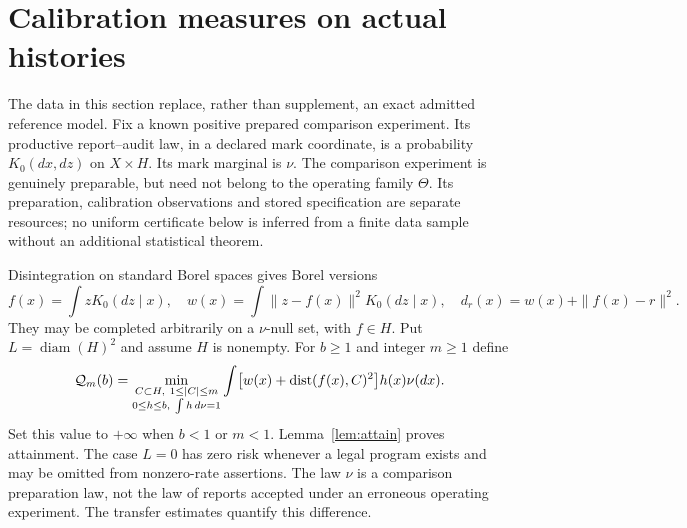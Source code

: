 \section{Calibration measures on actual histories}
\label{sec:calibrated}
The data in this section replace, rather than supplement, an exact admitted reference model. Fix a known positive prepared comparison experiment. Its productive report--audit law, in a declared mark coordinate, is a probability $K_0(dx,dz)$ on $X\times H$. Its mark marginal is $\nu$. The comparison experiment is genuinely preparable, but need not belong to the operating family $\Theta$. Its preparation, calibration observations and stored specification are separate resources; no uniform certificate below is inferred from a finite data sample without an additional statistical theorem.

Disintegration on standard Borel spaces gives Borel versions
\begin{equation}\label{eq:derived}
 f(x)=\int zK_0(dz\mid x),\quad
 w(x)=\int\|z-f(x)\|^2K_0(dz\mid x),\quad
 d_r(x)=w(x)+\|f(x)-r\|^2.
\end{equation}
They may be completed arbitrarily on a $\nu$-null set, with $f\in H$. Put $L=\operatorname{diam}(H)^2$ and assume $H$ is nonempty. For $b\ge1$ and integer $m\ge1$ define
\begin{equation}\label{eq:profile}
 \mathcal Q_m(b)=\min_{\substack{C\subset H,\ 1\le|C|\le m\\
                    0\le h\le b,\ \int h\,d\nu=1}}
 \int\bigl[w(x)+\operatorname{dist}(f(x),C)^2\bigr]h(x)\nu(dx).
\end{equation}
Set this value to $+\infty$ when $b<1$ or $m<1$. Lemma~\ref{lem:attain} proves attainment. The case $L=0$ has zero risk whenever a legal program exists and may be omitted from nonzero-rate assertions. The law $\nu$ is a comparison preparation law, not the law of reports accepted under an erroneous operating experiment. The transfer estimates quantify this difference.

